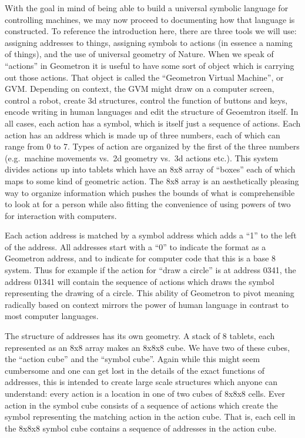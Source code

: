 With the goal in mind of being able to build a universal symbolic
language for controlling machines, we may now proceed to documenting how
that language is constructed. To reference the introduction here, there
are three tools we will use: assigning addresses to things, assigning
symbols to actions (in essence a naming of things), and the use of
universal geometry of Nature. When we speak of ``actions'' in Geometron
it is useful to have some sort of object which is carrying out those
actions. That object is called the ``Geometron Virtual Machine'', or
GVM. Depending on context, the GVM might draw on a computer screen,
control a robot, create 3d structures, control the function of buttons
and keys, encode writing in human languages and edit the structure of
Geoemtron itself. In all cases, each action has a symbol, which is
itself just a sequence of actions. Each action has an address which is
made up of three numbers, each of which can range from 0 to 7. Types of
action are organized by the first of the three numbers (e.g.~machine
movements vs.~2d geometry vs.~3d actions etc.). This system divides
actions up into tablets which have an 8x8 array of ``boxes'' each of
which maps to some kind of geometric action. The 8x8 array is an
aesthetically pleasing way to organize information which pushes the
bounds of what is comprehensible to look at for a person while also
fitting the convenience of using powers of two for interaction with
computers.

Each action address is matched by a symbol address which adds a ``1'' to
the left of the address. All addresses start with a ``0'' to indicate
the format as a Geometron address, and to indicate for computer code
that this is a base 8 system. Thus for example if the action for ``draw
a circle'' is at address 0341, the address 01341 will contain the
sequence of actions which draws the symbol representing the drawing of a
circle. This ability of Geometron to pivot meaning radically based on
context mirrors the power of human language in contrast to most computer
languages.

The structure of addresses has its own geometry. A stack of 8 tablets,
each represented as an 8x8 array makes an 8x8x8 cube. We have two of
these cubes, the ``action cube'' and the ``symbol cube''. Again while
this might seem cumbersome and one can get lost in the details of the
exact functions of addresses, this is intended to create large scale
structures which anyone can understand: every action is a location in
one of two cubes of 8x8x8 cells. Ever action in the symbol cube consists
of a sequence of actions which create the symbol representing the
matching action in the action cube. That is, each cell in the 8x8x8
symbol cube contains a sequence of addresses in the action cube.

